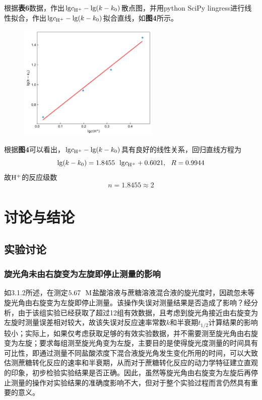 \documentclass[12pt]{article}
\begin{document}
\par
根据\textbf{表6}数据，作出${\rm lg}c_{\rm H^{+}}-{\rm lg}(k-k_{0})$散点图，并用python SciPy lingress进行线性拟合，作出${\rm lg}c_{\rm H^{+}}-{\rm lg}(k-k_{0})$拟合直线，如\textbf{图4}所示。
\begin{figure}[h]
	\centering
	\includegraphics[width=0.6\textwidth]{4.jpg}
\end{figure}
\par
根据\textbf{图4}可以看出，${\rm lg}c_{\rm H^{+}}-{\rm lg}(k-k_{0})$具有良好的线性关系，回归直线方程为
$$
{\rm lg}(k-k_{0})=1.8455\ \ {\rm lg}c_{\rm H^{+}}+0.6021,\ \ R=0.9944
$$
故$\rm H^{+}$的反应级数
$$
n=1.8455\approx2
$$

 	 \section{讨论与结论}
		\subsection{实验讨论}
 			\subsubsection{旋光角未由右旋变为左旋即停止测量的影响}
如3.1.2所述，在测定$5.67\ \ {\rm M}$盐酸溶液与蔗糖溶液混合液的旋光度时，因疏忽未等旋光角由右旋变为左旋即停止测量。该操作失误对测量结果是否造成了影响？经分析，由于该组实验已经获取了超过12组有效数据，且考虑到旋光角接近由右旋变为左旋时测量误差相对较大，故该失误对反应速率常数$k$和半衰期$t_{1/2}$计算结果的影响较小；实际上，如果仅考虑获取足够的有效实验数据，并不需要测至旋光角由右旋变为左旋；要求每组测至旋光角变为左旋，主要目的是使得旋光度测量的时间具有可比性，即通过测量不同盐酸浓度下混合液旋光角发生变化所用的时间，可以大致估测蔗糖转化反应的速率和半衰期，从而对于蔗糖转化反应的动力学特征建立直观的印象，初步检验实验结果是否正确。因此，虽然等旋光角由右旋变为左旋后再停止测量的操作对实验结果的准确度影响不大，但对于整个实验过程而言仍然具有重要的意义。
\end{document}

